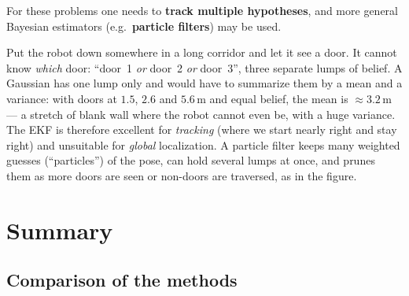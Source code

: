 \documentclass[11pt,a4paper]{article}
\theoremstyle{definition}
\theoremstyle{plain}
\theoremstyle{remark}
\begin{document}
For these problems one needs to \textbf{track multiple hypotheses}, and more general Bayesian estimators (e.g.\ \textbf{particle filters}) may be used.

\begin{intuition}
Put the robot down somewhere in a long corridor and let it see a door. It cannot know \emph{which} door: ``door~1 \emph{or} door~2 \emph{or} door~3'', three separate lumps of belief. A Gaussian has one lump only and would have to summarize them by a mean and a variance: with doors at $1.5$, $2.6$ and $5.6$\,m and equal belief, the mean is $\approx3.2$\,m --- a stretch of blank wall where the robot cannot even be, with a huge variance. The EKF is therefore excellent for \emph{tracking} (where we start nearly right and stay right) and unsuitable for \emph{global} localization. A particle filter keeps many weighted guesses (``particles'') of the pose, can hold several lumps at once, and prunes them as more doors are seen or non-doors are traversed, as in the figure.
\end{intuition}

\section{Summary}

\subsection{Comparison of the methods}
\end{document}
